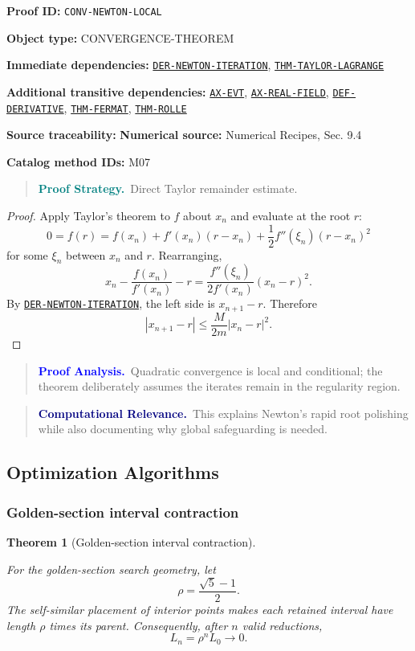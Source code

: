 \documentclass[10pt]{article}
\newcommand{\pidraw}[1]{\begingroup\urlstyle{tt}\nolinkurl{#1}\endgroup}
\newcommand{\pidref}[1]{\hyperref[prf:#1]{\pidraw{#1}}}
\newcommand{\pid}[1]{\pidref{#1}}
\newtheorem{theorem}{Theorem}[section]
\theoremstyle{definition}
\theoremstyle{remark}
\newenvironment{proofstrategy}
{\begin{quote}\small\noindent\textbf{\textcolor{teal}{Proof Strategy.}}\ }
{\end{quote}}
\newenvironment{proofanalysis}
{\begin{quote}\small\noindent\textbf{\textcolor{blue}{Proof Analysis.}}\ }
{\end{quote}}
\newenvironment{computationalrelevance}
{\begin{quote}\small\noindent\textbf{\textcolor{navy}{Computational Relevance.}}\ }
{\end{quote}}
\newcommand{\meta}[2]{\noindent\textbf{#1:} #2\par}
\begin{document}
\meta{Proof ID}{\pidraw{CONV-NEWTON-LOCAL}}
\meta{Object type}{CONVERGENCE-THEOREM}
\meta{Immediate dependencies}{\pidref{DER-NEWTON-ITERATION}, \pidref{THM-TAYLOR-LAGRANGE}}
\meta{Additional transitive dependencies}{\pidref{AX-EVT}, \pidref{AX-REAL-FIELD}, \pidref{DEF-DERIVATIVE}, \pidref{THM-FERMAT}, \pidref{THM-ROLLE}}
\meta{Source traceability}{\textbf{Numerical source:} Numerical Recipes, Sec. 9.4}
\meta{Catalog method IDs}{M07}

\begin{proofstrategy}Direct Taylor remainder estimate.\end{proofstrategy}

\begin{proof}

Apply Taylor's theorem to $f$ about $x_n$ and evaluate at the root $r$:
\[
0=f(r)=f(x_n)+f'(x_n)(r-x_n)
+\frac12 f''(\xi_n)(r-x_n)^2
\]
for some $\xi_n$ between $x_n$ and $r$. Rearranging,
\[
x_n-\frac{f(x_n)}{f'(x_n)}-r
=
\frac{f''(\xi_n)}{2f'(x_n)}(x_n-r)^2.
\]
By \pid{DER-NEWTON-ITERATION}, the left side is $x_{n+1}-r$. Therefore
\[
|x_{n+1}-r|
\le
\frac{M}{2m}|x_n-r|^2.
\]

\end{proof}

\begin{proofanalysis}Quadratic convergence is local and conditional; the theorem deliberately assumes the iterates remain in the regularity region.\end{proofanalysis}

\begin{computationalrelevance}This explains Newton's rapid root polishing while also documenting why global safeguarding is needed.\end{computationalrelevance}

\subsection{Optimization Algorithms}

\subsubsection{Golden-section interval contraction}

\begin{theorem}[Golden-section interval contraction]\label{prf:CONV-GOLDEN-SECTION}

For the golden-section search geometry, let
\[
\rho=\frac{\sqrt5-1}{2}.
\]
The self-similar placement of interior points makes each retained interval have length $\rho$ times its parent. Consequently, after $n$ valid reductions,
\[
L_n=\rho^n L_0\to0.
\]

\end{theorem}
\end{document}
